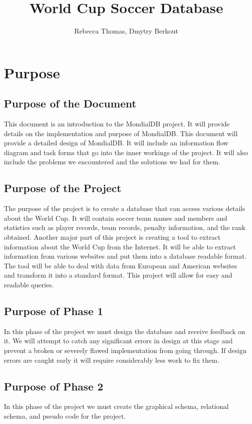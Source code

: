 \documentclass{article}
\title{World Cup Soccer Database}
\author{Rebecca Thomas, Dmytry Berkout}
\begin{document}
\maketitle
\hypersetup{linktoc=all, linktocpage}
\setcounter{tocdepth}{2}
\tableofcontents{}
\newpage

\section{Purpose}
\subsection{Purpose of the Document}
This document is an introduction to the MondialDB project. It will provide details on the implementation and purpose of MondialDB. This document will provide a detailed design of MondialDB. It will include an information flow diagram and task forms that go into the inner workings of the project. It will also include the problems we encountered and the solutions we had for them.

\subsection{Purpose of the Project}
The purpose of the project is to create a database that can access various details about the World Cup. It will contain soccer team names and members and statistics such as player records, team records, penalty information, and the rank obtained. Another major part of this project is creating a tool to extract information about the World Cup from the Internet. It will be able to extract information from various websites and put them into a database readable format. The tool will be able to deal with data from European and American websites and transform it into a standard format. This project will allow for easy and readable queries.

\subsection{Purpose of Phase 1}
In this phase of the project we must design the database and receive feedback on it. We will attempt to catch any significant errors in design at this stage and prevent a broken or severely flawed implementation from going through. If design errors are caught early it will require considerably less work to fix them. 

\subsection{Purpose of Phase 2}
In this phase of the project we must create the graphical schema, relational schema, and pseudo code for the project.
\end{document}
